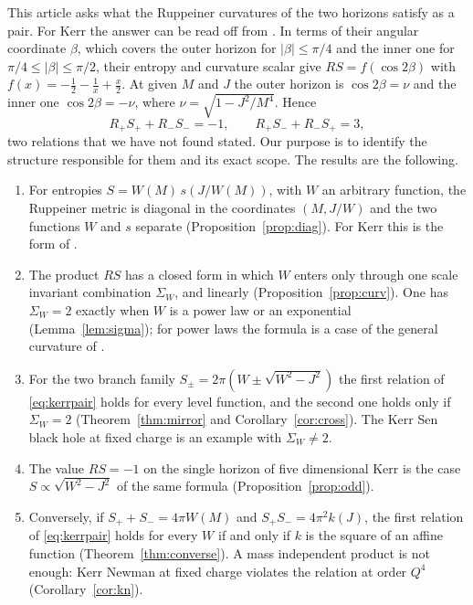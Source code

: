 \documentclass[11pt]{article}
\theoremstyle{definition}
\theoremstyle{remark}
\newcommand{\SW}{\Sigma_{W}}
\begin{document}
This article asks what the Ruppeiner curvatures of the two horizons satisfy as a pair. For Kerr the answer can be read off from \cite{ABP15}. In terms of their angular coordinate $\beta$, which covers the outer horizon for $|\beta|\le\pi/4$ and the inner one for $\pi/4\le|\beta|\le\pi/2$, their entropy and curvature scalar give $RS=f(\cos2\beta)$ with $f(x)=-\tfrac12-\tfrac1x+\tfrac x2$. At given $M$ and $J$ the outer horizon is $\cos2\beta=\nu$ and the inner one $\cos2\beta=-\nu$, where $\nu=\sqrt{1-J^{2}/M^{4}}$. Hence
\begin{equation}\label{eq:kerrpair}
R_{+}S_{+}+R_{-}S_{-}=-1,
\qquad
R_{+}S_{-}+R_{-}S_{+}=3 ,
\end{equation}
two relations that we have not found stated. Our purpose is to identify the structure responsible for them and its exact scope. The results are the following.
\begin{enumerate}
\item For entropies $S=W(M)\,s(J/W(M))$, with $W$ an arbitrary function, the Ruppeiner metric is diagonal in the coordinates $(M,J/W)$ and the two functions $W$ and $s$ separate (Proposition~\ref{prop:diag}). For Kerr this is the form of \cite{ABP15}.
\item The product $RS$ has a closed form in which $W$ enters only through one scale invariant combination $\SW$, and linearly (Proposition~\ref{prop:curv}). One has $\SW=2$ exactly when $W$ is a power law or an exponential (Lemma~\ref{lem:sigma}); for power laws the formula is a case of the general curvature of \cite{ABP06}.
\item For the two branch family $S_{\pm}=2\pi(W\pm\sqrt{W^{2}-J^{2}})$ the first relation of \eqref{eq:kerrpair} holds for every level function, and the second one holds only if $\SW=2$ (Theorem~\ref{thm:mirror} and Corollary~\ref{cor:cross}). The Kerr Sen black hole at fixed charge is an example with $\SW\neq2$.
\item The value $RS=-1$ on the single horizon of five dimensional Kerr \cite{AP06} is the case $S\propto\sqrt{W^{2}-J^{2}}$ of the same formula (Proposition~\ref{prop:odd}).
\item Conversely, if $S_{+}+S_{-}=4\pi W(M)$ and $S_{+}S_{-}=4\pi^{2}k(J)$, the first relation of \eqref{eq:kerrpair} holds for every $W$ if and only if $k$ is the square of an affine function (Theorem~\ref{thm:converse}). A mass independent product is not enough: Kerr Newman at fixed charge violates the relation at order $Q^{4}$ (Corollary~\ref{cor:kn}).
\end{enumerate}
\end{document}
